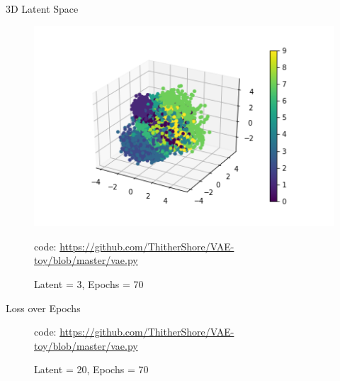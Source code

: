 \documentclass{beamer}
\begin{document}
\begin{frame}{3D Latent Space}
\begin{figure}[htbp]
\includegraphics[width=0.9\columnwidth]{fig/3d.png}
\caption{Latent = 3, Epochs = 70}
\textcolor[RGB]{185 181 205}{\small code: \url{https://github.com/ThitherShore/VAE-toy/blob/master/vae.py}}
\end{figure}
\end{frame}
\begin{frame}{Loss over Epochs}
\begin{figure}[htbp] \centering
{}
\caption{Latent = 20, Epochs = 70}
\textcolor[RGB]{185 181 205}{\small code: \url{https://github.com/ThitherShore/VAE-toy/blob/master/vae.py}}
\end{figure}
\end{frame}
\end{document}
